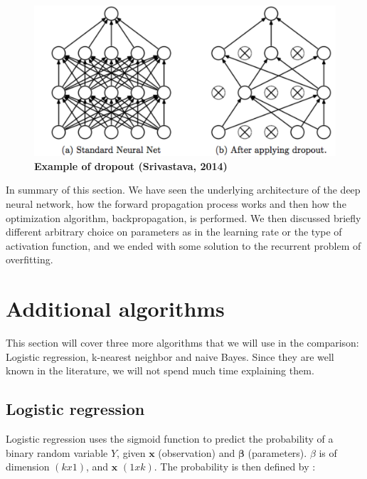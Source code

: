 \documentclass[a4paper,12pt]{article}
\numberwithin{equation}{section}
\begin{document}
\begin{figure}[htb]%
    \begin{center}
    \includegraphics[scale = 0.5]{Figure3ANN.png}%
    \caption{\textbf{Example of dropout (Srivastava, 2014)}}
    \label{fig5:ANN dropout}%
    \end{center}
\end{figure}

In summary of this section. We have seen the underlying architecture of the deep neural network, how the forward propagation process works and then how the optimization algorithm, backpropagation, is performed. We then discussed briefly different arbitrary choice on parameters as in the learning rate or the type of activation function, and we ended with some solution to the recurrent problem of overfitting.

\newpage


\section{Additional algorithms}

This section will cover three more algorithms that we will use in the comparison: Logistic regression, k-nearest neighbor and naive Bayes. Since they are well known in the literature, we will not spend much time explaining them.

\subsection{Logistic regression}

Logistic regression uses the sigmoid function to predict the probability of a binary random variable $Y$, given $\boldsymbol{x}$ (observation) and $\boldsymbol{\beta}$ (parameters). $\beta$ is of dimension $(k x 1)$, and $\boldsymbol{x}$ $(1 x k)$.  The probability is then defined by :
\end{document}

